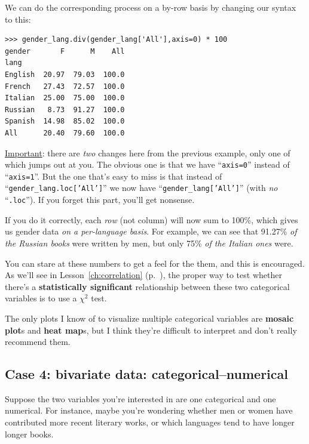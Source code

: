 We can do the corresponding process on a by-row basis by changing our syntax to
this:

\begin{Verbatim}[fontsize=\scriptsize,samepage=true,frame=single]
>>> gender_lang.div(gender_lang['All'],axis=0) * 100
gender       F      M    All
lang                        
English  20.97  79.03  100.0
French   27.43  72.57  100.0
Italian  25.00  75.00  100.0
Russian   8.73  91.27  100.0
Spanish  14.98  85.02  100.0
All      20.40  79.60  100.0
\end{Verbatim}

\underline{Important}: there are \textit{two} changes here from the previous
example, only one of which jumps out at you. The obvious one is that we have
``\texttt{axis=0}'' instead of ``\texttt{axis=1}''. But the one that's easy to
miss is that instead of ``\texttt{gender\_lang.loc['All']}'' we now have
``\texttt{gender\_lang['All']}'' (with \textit{no} ``\texttt{.loc}''). If you
forget this part, you'll get nonsense.

If you do it correctly, each \textit{row} (not column) will now sum to 100\%,
which gives us gender data \textit{on a per-language basis}. For example,
we can see that 91.27\% \textit{of the Russian books} were written by
men, but only 75\% \textit{of the Italian ones} were.

You can stare at these numbers to get a feel for the them, and this is
encouraged. As we'll see in Lesson~\ref{ch:correlation} (p.~\pageref{chisq}),
the proper way to test whether there's a \textbf{statistically significant}
relationship between these two categorical variables is to use a $\chi ^2$
test.

The only plots I know of to visualize multiple categorical variables are
\textbf{mosaic plot}s and \textbf{heat map}s, but I think they're difficult to
interpret and don't really recommend them.

\label{marginsEnd}

\subsection{Case 4: bivariate data: categorical--numerical}

Suppose the two variables you're interested in are one categorical and one
numerical. For instance, maybe you're wondering whether men or women have
contributed more recent literary works, or which languages tend to have longer
longer books. 


